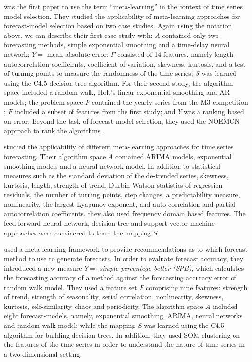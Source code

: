\documentclass[11pt,a4paper,]{article}
\begin{document}
\textcite{prudencio2004meta} was the first paper to use the term ``meta-learning'' in the context of time series model selection. They studied the applicability of meta-learning approaches for forecast-model selection based on two case studies. Again using the notation above, we can describe their first case study with: \(A\) contained only two forecasting methods, simple exponential smoothing and a time-delay neural network; \(Y=\) mean absolute error; \(F\) consisted of 14 features, namely length, autocorrelation coefficients, coefficient of variation, skewness, kurtosis, and a test of turning points to measure the randomness of the time series; \(S\) was learned using the C4.5 decision tree algorithm. For their second study, the algorithm space included a random walk, Holt's linear exponential smoothing and AR models; the problem space \(P\) contained the yearly series from the M3 competition \autocite{makridakis2000m3}; \(F\) included a subset of features from the first study; and \(Y\) was a ranking based on error. Beyond the task of forecast-model selection, they used the NOEMON approach to rank the algorithms \autocite{kalousis1999noemon}.

\textcite{lemke2010meta} studied the applicability of different meta-learning approaches for time series forecasting. Their algorithm space \(A\) contained ARIMA models, exponential smoothing models and a neural network model. In addition to statistical measures such as the standard deviation of the de-trended series, skewness, kurtosis, length, strength of trend, Durbin-Watson statistics of regression residuals, the number of turning points, step changes, a predictability measure, nonlinearity, the largest Lyapunov exponent, and auto-correlation and partial-autocorrelation coefficients, they also used frequency domain based features. The feed forward neural network, decision tree and support vector machine approaches were considered to learn the mapping \(S\).

\textcite{wang2009rule} used a meta-learning framework to provide recommendations as to which forecast method to use to generate forecasts. In order to evaluate forecast accuracy, they introduced a new measure \(Y =\) \emph{simple percentage better (SPB)}, which calculates the forecasting accuracy of a method against the forecasting accuracy error of random walk model. They used a feature set \(F\) comprising nine features: strength of trend, strength of seasonality, serial correlation, nonlinearity, skewness, kurtosis, self-similarity, chaos and periodicity. The algorithm space \(A\) included eight forecast-models, namely, exponential smoothing, ARIMA, neural networks and random walk model; while the mapping \(S\) was learned using the C4.5 algorithm for building decision trees. In addition, they used SOM clustering on the features of the time series in order to understand the nature of time series in a two-dimensional setting.
\end{document}
